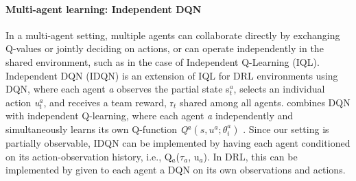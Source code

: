 \documentclass{llncs}
\begin{document}




\paragraph{\textbf{Multi-agent learning: Independent DQN}}
In a multi-agent setting, multiple agents can collaborate directly by exchanging Q-values or jointly deciding on actions, or can operate independently in the shared environment, such as in the case of Independent Q-Learning (IQL)\cite{Tan1993}. Independent DQN (IDQN) is an extension of IQL for DRL environments using DQN, where each agent \textit{a} observes the partial state s$_{t}^{a}$, selects an individual action \textit{u$_{t}^{a}$}, and receives a team reward, r$_{t}$ shared among all agents. \cite{Tampuu2015} combines DQN with independent Q-learning, where each agent \textit{a} independently and simultaneously learns its own Q-function \textit{Q$^{a}(s, u^{a};\theta^{a}_{i})$} \cite{DBLP:journals/corr/FoersterAFW16a}. Since our setting is partially observable, IDQN can be implemented by having each agent conditioned on its action-observation history, i.e., Q$_{a}$($\tau_{a}$, u$_{a}$). In DRL, this can be implemented by given to each agent a DQN on its own observations and actions.
\end{document}
